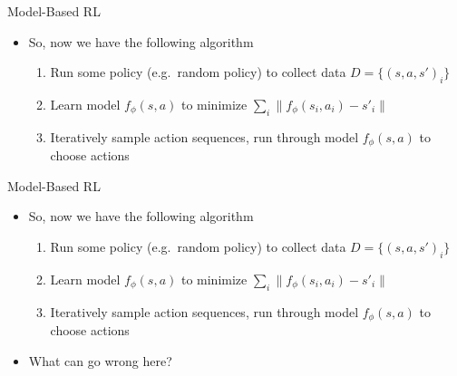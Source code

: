 \begin{frame}{Model-Based RL}
\begin{itemize}
    \item So, now we have the following algorithm
    \begin{enumerate}
        \item Run some policy (e.g.\ random policy) to collect data
              $D = \{(s, a, s')_i\}$
        \item Learn model $f_\phi(s, a)$ to minimize $\sum_i \lVert f_\phi(s_i, a_i) - s'_i \rVert$
        \item Iteratively sample action sequences, run through model $f_\phi(s, a)$ to
              choose actions
    \end{enumerate}
\end{itemize}
\end{frame}

\begin{frame}{Model-Based RL}
\begin{itemize}
    \item So, now we have the following algorithm
    \begin{enumerate}
        \item Run some policy (e.g.\ random policy) to collect data
              $D = \{(s, a, s')_i\}$
        \item Learn model $f_\phi(s, a)$ to minimize $\sum_i \lVert f_\phi(s_i, a_i) - s'_i \rVert$
        \item Iteratively sample action sequences, run through model $f_\phi(s, a)$ to
              choose actions
    \end{enumerate}
    \item What can go wrong here?
\end{itemize}
\end{frame}

